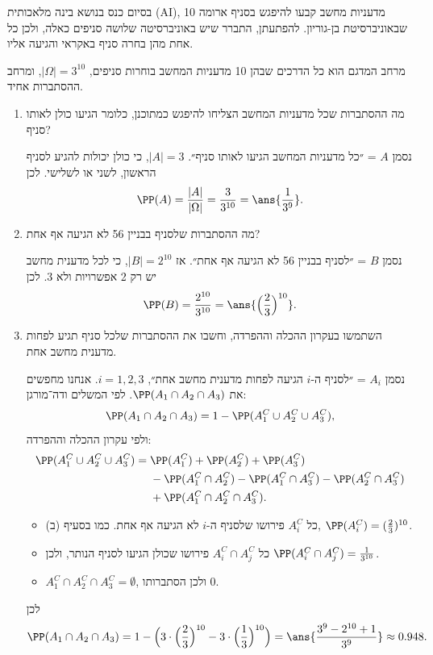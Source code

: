 בסיום כנס בנושא בינה מלאכותית (\textenglish{AI}), 10 מדעניות מחשב קבעו להיפגש בסניף ארומה שבאוניברסיטת בן-גוריון. להפתעתן, התברר שיש באוניברסיטה שלושה סניפים כאלה, ולכן כל אחת מהן בחרה סניף באקראי והגיעה אליו.
\begin{solbox}
מרחב המדגם הוא כל הדרכים שבהן 10 מדעניות המחשב בוחרות סניפים, $|\Omega|=3^{10}$, ומרחב ההסתברות אחיד.
\end{solbox}
\begin{enumerate}
\item מה ההסתברות שכל מדעניות המחשב הצליחו להיפגש כמתוכנן, כלומר הגיעו כולן לאותו סניף?
\begin{solbox}
נסמן $A$ = ״כל מדעניות המחשב הגיעו לאותו סניף״. $|A|=3$, כי כולן יכולות להגיע לסניף הראשון, לשני או לשלישי. לכן
\[
\PP(A)=\frac{|A|}{|\Omega|}=\frac3{3^{10}}=\ans{\frac1{3^9}}.
\]
\end{solbox}
\item מה ההסתברות שלסניף בבניין 56 לא הגיעה אף אחת?
\begin{solbox}
נסמן $B$ = ״לסניף בבניין 56 לא הגיעה אף אחת״. אז $|B|=2^{10}$, כי לכל מדענית מחשב יש רק 2 אפשרויות ולא 3. לכן
\[
\PP(B)=\frac{2^{10}}{3^{10}}=\ans{\Big(\frac23\Big)^{10}}.
\]
\end{solbox}
\item השתמשו בעקרון ההכלה וההפרדה, וחשבו את ההסתברות שלכל סניף תגיע לפחות מדענית מחשב אחת.
\begin{solbox}
נסמן $A_i$ = ״לסניף ה-$i$ הגיעה לפחות מדענית מחשב אחת״, $i=1,2,3$. אנחנו מחפשים את $\PP(A_1\cap A_2\cap A_3)$. לפי המשלים ודה־מורגן:
\[
\PP(A_1\cap A_2\cap A_3)=1-\PP(A_1^C\cup A_2^C\cup A_3^C),
\]
ולפי עקרון ההכלה וההפרדה:
\[
\begin{split}
\PP(A_1^C\cup A_2^C\cup A_3^C)={}&\PP(A_1^C)+\PP(A_2^C)+\PP(A_3^C)\\
&-\PP(A_1^C\cap A_2^C)-\PP(A_1^C\cap A_3^C)-\PP(A_2^C\cap A_3^C)\\
&+\PP(A_1^C\cap A_2^C\cap A_3^C).
\end{split}
\]

\begin{itemize}
\item כל $A_i^C$ פירושו שלסניף ה-$i$ לא הגיעה אף אחת. כמו בסעיף (ב), $\PP(A_i^C)=(\frac23)^{10}$.
\item כל $A_i^C\cap A_j^C$ פירושו שכולן הגיעו לסניף הנותר, ולכן $\PP(A_i^C\cap A_j^C)=\frac1{3^{10}}$.
\item $A_1^C\cap A_2^C\cap A_3^C=\emptyset$, ולכן הסתברותו $0$.
\end{itemize}
לכן
\[
\PP(A_1\cap A_2\cap A_3)=1-\Big(3\cdot\Big(\frac23\Big)^{10}-3\cdot\Big(\frac13\Big)^{10}\Big)=\ans{\frac{3^9-2^{10}+1}{3^9}}\approx0.948.
\]
\end{solbox}
\end{enumerate}
